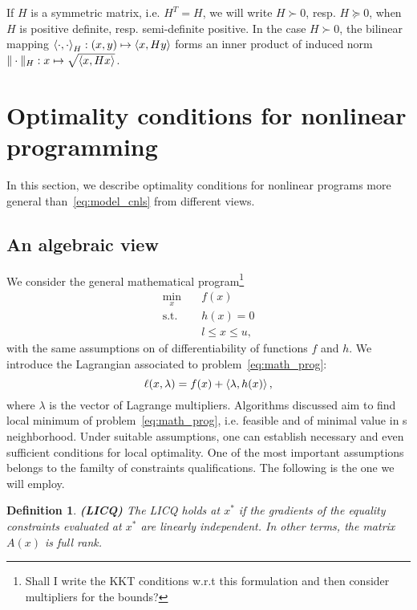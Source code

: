 \documentclass[10pt]{article}
\newtheorem{definition}[theorem]{Definition}
\numberwithin{equation}{section}
\begin{document}
	If $H$ is a symmetric matrix, i.e. $H^T=H$, we will write $H \succ 0$, resp. $H \succeq 0$, when $H$ is positive definite, resp. semi-definite positive. In the case $H\succ 0$, the bilinear mapping $\left\langle {\cdot} , {\cdot} \right\rangle_H:(x,y) \mapsto \left\langle {x} , {Hy} \right\rangle $ forms an inner product of induced norm $\|\cdot\|_H:x\mapsto \sqrt{\left\langle {x} , {Hx} \right\rangle}$.
	
	\section{Optimality conditions for nonlinear programming}
	
	In this section, we describe optimality conditions for nonlinear programs more general than~\eqref{eq:model_cnls} from different views.
	
	\subsection{An algebraic view}
	
	We consider the general mathematical program\footnote{Shall I write the KKT conditions w.r.t this formulation and then consider multipliers for the bounds?}
	\begin{equation}
		\label{eq:math_prog}
		\begin{aligned}
			\min_x \quad & f(x) \\
			\text{s.t.} \quad & h(x)=0 \\
			& l \le x \le u,
		\end{aligned}
	\end{equation}
	with the same assumptions on of differentiability of functions $f$ and \(h\). We introduce the Lagrangian associated to problem~\eqref{eq:math_prog}:
	\begin{equation}
		\label{eq:lagrangian}
		\ell(x,\lambda) = f(x) + \left\langle {\lambda} , {h(x)} \right\rangle,
	\end{equation}
	where $\lambda$ is the vector of Lagrange multipliers. Algorithms discussed aim to find local minimum of problem~\eqref{eq:math_prog}, i.e. feasible and of minimal value in s neighborhood. Under suitable assumptions, one can establish necessary and even sufficient conditions for local optimality. One of the most important assumptions belongs to the familty of constraints qualifications. The following is the one we will employ.
	
	\begin{definition}\label{def:licq}
		\textbf{(LICQ)}
		The LICQ holds at $x^*$ if the gradients of the equality constraints evaluated at $x^*$ are linearly independent. In other terms, the matrix $A(x)$ is full rank.
	\end{definition}
	
\end{document}
